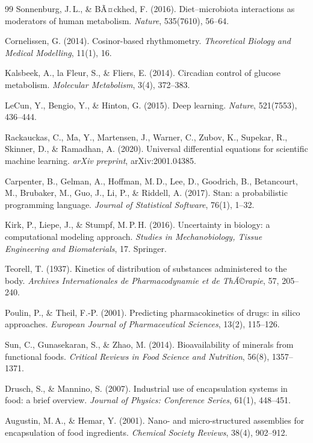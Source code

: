 ﻿\documentclass[12pt,a4paper]{article}
\theoremstyle{plain}
\theoremstyle{definition}
\theoremstyle{remark}
\begin{document}
\begin{thebibliography}{99}
Sonnenburg, J.\,L., \& BÃ¤ckhed, F. (2016).
Diet--microbiota interactions as moderators of human metabolism.
\textit{Nature}, 535(7610), 56--64.

Cornelissen, G. (2014).
Cosinor-based rhythmometry.
\textit{Theoretical Biology and Medical Modelling}, 11(1), 16.

Kalsbeek, A., la Fleur, S., \& Fliers, E. (2014).
Circadian control of glucose metabolism.
\textit{Molecular Metabolism}, 3(4), 372--383.

LeCun, Y., Bengio, Y., \& Hinton, G. (2015).
Deep learning.
\textit{Nature}, 521(7553), 436--444.

Rackauckas, C., Ma, Y., Martensen, J., Warner, C., Zubov, K.,
Supekar, R., Skinner, D., \& Ramadhan, A. (2020).
Universal differential equations for scientific machine learning.
\textit{arXiv preprint}, arXiv:2001.04385.

Carpenter, B., Gelman, A., Hoffman, M.\,D., Lee, D., Goodrich, B.,
Betancourt, M., Brubaker, M., Guo, J., Li, P., \& Riddell, A. (2017).
Stan: a probabilistic programming language.
\textit{Journal of Statistical Software}, 76(1), 1--32.

Kirk, P., Liepe, J., \& Stumpf, M.\,P.\,H. (2016).
Uncertainty in biology: a computational modeling approach.
\textit{Studies in Mechanobiology, Tissue Engineering and Biomaterials}, 17.
Springer.

Teorell, T. (1937).
Kinetics of distribution of substances administered to the body.
\textit{Archives Internationales de Pharmacodynamie et de ThÃ©rapie},
57, 205--240.

Poulin, P., \& Theil, F.-P. (2001).
Predicting pharmacokinetics of drugs: in silico approaches.
\textit{European Journal of Pharmaceutical Sciences}, 13(2), 115--126.

Sun, C., Gunasekaran, S., \& Zhao, M. (2014).
Bioavailability of minerals from functional foods.
\textit{Critical Reviews in Food Science and Nutrition}, 56(8), 1357--1371.

Drusch, S., \& Mannino, S. (2007).
Industrial use of encapsulation systems in food: a brief overview.
\textit{Journal of Physics: Conference Series}, 61(1), 448--451.

Augustin, M.\,A., \& Hemar, Y. (2001).
Nano- and micro-structured assemblies for encapsulation of food ingredients.
\textit{Chemical Society Reviews}, 38(4), 902--912.


\end{thebibliography}
\end{document}
